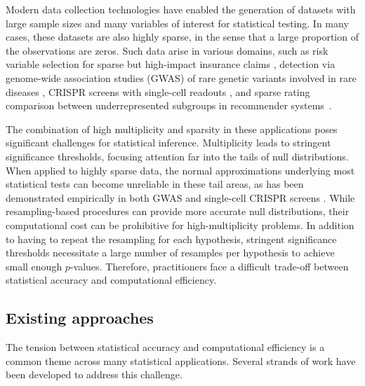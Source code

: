 \documentclass[12pt]{article}
\theoremstyle{definition}
\begin{document}
Modern data collection technologies have enabled the generation of datasets with large sample sizes and many variables of interest for statistical testing. In many cases, these datasets are also highly sparse, in the sense that a large proportion of the observations are zeros. Such data arise in various domains, such as risk variable selection for sparse but high-impact insurance claims \citep{wang2015variable}, detection via genome-wide association studies (GWAS) of rare genetic variants involved in rare diseases \citep{Dey2017,zhao2020uk}, CRISPR screens with single-cell readouts \citep{Dixit2016, Adamson2016}, and sparse rating comparison between underrepresented subgroups in recommender systems~\citep{yao2017beyond}. 

The combination of high multiplicity and sparsity in these applications poses significant challenges for statistical inference. Multiplicity leads to stringent significance thresholds, focusing attention far into the tails of null distributions. When applied to highly sparse data, the normal approximations underlying most statistical tests can become unreliable in these tail areas, as has been demonstrated empirically in both GWAS \citep{Dey2017} and single-cell CRISPR screens \citep{Barry2024}. While resampling-based procedures can provide more accurate null distributions, their computational cost can be prohibitive for high-multiplicity problems. In addition to having to repeat the resampling for each hypothesis, stringent significance thresholds necessitate a large number of resamples per hypothesis to achieve small enough $p$-values. Therefore, practitioners face a difficult trade-off between statistical accuracy and computational efficiency.

  
\subsection{Existing approaches}\label{sec:relevant-literature}
  
The tension between statistical accuracy and computational efficiency is a common theme across many statistical applications. Several strands of work have been developed to address this challenge.
  
\end{document}
